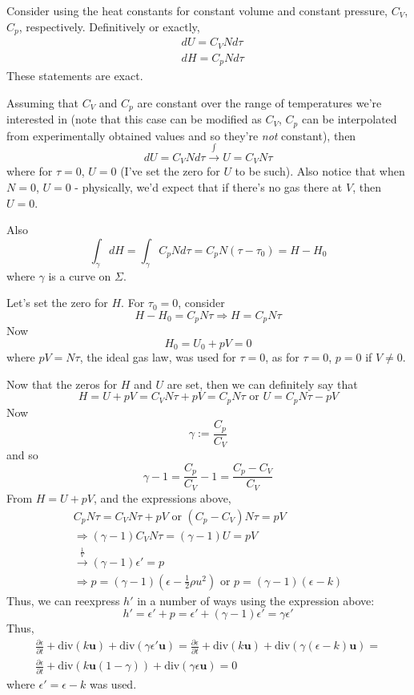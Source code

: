 \documentclass[10pt]{amsart}
\begin{document}
\begin{multicols*}{2}
Consider using the heat constants for constant volume and constant pressure, $C_V$, $C_p$, respectively.  Definitively or exactly,
\[
\begin{aligned}
  & dU = C_V N d\tau \\ 
  & dH = C_p N d\tau
  \end{aligned}
\]
These statements are exact.

Assuming that $C_V$ and $C_p$ are constant over the range of temperatures we're interested in (note that this case can be modified as $C_V$, $C_p$ can be interpolated from experimentally obtained values and so they're \emph{not} constant), then
\[
dU=C_V N d\tau \xrightarrow{ \int } U = C_V N \tau
\]
where for $\tau=0$, $U=0$ (I've set the zero for $U$ to be such).  Also notice that when $N=0$, $U=0$ - physically, we'd expect that if there's no gas there at $V$, then $U=0$.  

Also
\[
\int_{\gamma} dH = \int_{\gamma} C_p N d\tau = C_pN(\tau-\tau_0) = H-H_0
\]
where $\gamma$ is a curve on $\Sigma$.

Let's set the zero for $H$.  For $\tau_0=0$, consider
\[
H-H_0 = C_pN\tau \Longrightarrow H = C_pN\tau
\]
Now
\[
H_0 = U_0 + pV = 0 
\]
where $pV=N\tau$, the ideal gas law, was used for $\tau=0$, as for $\tau =0$, $p=0$ if $V\neq 0$.

Now that the zeros for $H$ and $U$ are set, then we can definitely say that
\[
H = U + pV = C_VN\tau + pV = C_p N\tau \text{ or } U = C_pN\tau -pV
\]
Now
\[
\gamma := \frac{C_p}{C_V}
\]
and so
\[
\gamma -1 = \frac{C_p}{C_V} - 1 = \frac{C_p - C_V}{C_V}
\]
From $H=U+pV$, and the expressions above,
\[
\begin{gathered}
  C_pN\tau = C_VN\tau + pV \text{ or } (C_p- C_V)N\tau = pV \\ 
  \Longrightarrow (\gamma - 1) C_V N\tau = (\gamma -1) U = pV \\
  \xrightarrow{ \frac{1}{V} } (\gamma - 1 )\epsilon' = p  \\
  \Longrightarrow \boxed{ p = (\gamma - 1) ( \epsilon - \frac{1}{2} \rho u^2) } \text{ or } p = (\gamma - 1) ( \epsilon - k ) 
  \end{gathered}
\]
Thus, we can reexpress $h'$ in a number of ways using the expression above:
\[
h' = \epsilon' + p = \epsilon' + (\gamma -1) \epsilon' = \gamma \epsilon'
\]
Thus,
\[
\begin{gathered}
  \frac{ \partial \epsilon}{ \partial t} + \text{div}(k\mathbf{u}) + \text{div}(\gamma \epsilon' \mathbf{u} ) = \frac{ \partial \epsilon }{ \partial t} + \text{div}(k \mathbf{u} ) + \text{div}( \gamma ( \epsilon - k)\mathbf{u} ) = \\
  \frac{  \partial \epsilon}{ \partial t} + \text{div}(k\mathbf{u}(1-\gamma) ) + \text{div}(\gamma \epsilon \mathbf{u} ) = 0 
  \end{gathered}
\]
where $\epsilon' = \epsilon -k$ was used.


\end{multicols*}
\end{document}
